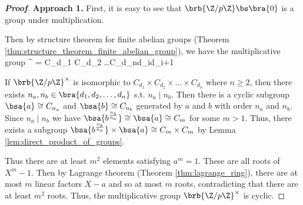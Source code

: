 \begin{proof}[\bf Proof]
{\bf Approach 1.} First, it is easy to see that $\brb{\Z/p\Z}\bs \bra{0}$ is a group under multiplication.




Then by structure theorem for finite abelian groups (Theorem \ref{thm:structure_theorem_finite_abelian_group}), we have the multiplicative group
\be
{}^{\times} = \bs {} \cong C_{d_1} \times C_{d_2} \times \dots \times C_{d_n}\quad {}d_i\mid d_{i+1}
\ee

If $\brb{\Z/p\Z}^{\times}$ is isomorphic to $C_{d_1} \times C_{d_2} \times \dots \times C_{d_n}$ where $n \geq 2$, then there exists $n_a,n_b \in \bra{d_1,d_2,\dots,d_n}$ s.t. $n_a\mid n_b$. Then there is a cyclic subgroup $\bsa{a} \cong C_{n_a}$ and $\bsa{b} \cong C_{n_b}$ generated by $a$ and $b$ with order $n_a$ and $n_b$. Since $n_a \mid n_b$ we have $\bsa{b^{\frac{n_b}{n_a}}} \cong \bsa{a} \cong C_m$ for some $m >1$. Thus, there exists a subgroup $\bsa{b^{\frac{n_b}{n_a}}} \times \bsa{a} \cong C_m \times C_m$ by Lemma \ref{lem:direct_product_of_groups}.




Thus there are at least $m^2$ elements satisfying $a^m = 1$. These are all roots of $X^m - 1$. Then by Lagrange theorem (Theorem \ref{thm:lagrange_ring}), there are at most $m$ linear factors $X - a$ and so at most $m$ roots, contradicting that there are at least $m^2$ roots. Thus, the multiplicative group $\brb{\Z/p\Z}^{\times}$ is cyclic.%


\end{proof}
